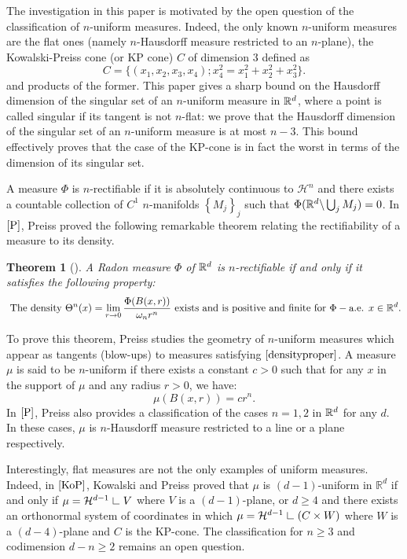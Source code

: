 \documentclass[11pt]{article}
\newtheorem{theorem}{Theorem}[section]
\theoremstyle{definition}
\theoremstyle{remark}
\numberwithin{equation}{section}
\newcommand{\res}{\hbox{{\vrule height .22cm}{\leaders\hrule\hskip .2cm}}}
\def\res{\hbox{ {\vrule height .22cm}{\leaders\hrule\hskip.2cm} } }
\begin{document}
 The investigation in this paper is motivated by the open question of the classification of $n$-uniform measures. Indeed, the only known $n$-uniform measures are the flat ones (namely $n$-Hausdorff measure restricted to an $n$-plane), the Kowalski-Preiss cone (or KP cone) $C$ of dimension $3$ defined as
\begin{equation}
\label{KPcone}
C =\{(x_1,x_2,x_3,x_4); x_4^2=x_1^2+x_2^2+x_3^2 \}.
\end{equation}
and products of the former.
This paper gives a sharp bound on the Hausdorff dimension of the singular set of an $n$-uniform measure in $\mathbb{R}^{d}$, where a point is called singular if its tangent is not $n$-flat: we prove that the Hausdorff dimension of the singular set of an $n$-uniform measure is at most $n-3$. 
This bound effectively proves that the case of the KP-cone is in fact the worst in terms of the dimension of its singular set.

A measure $\Phi$ is $n$-rectifiable if it is absolutely continuous to $\mathcal{H}^n$ and there exists a countable collection of $C^1$ $n$-manifolds $\left\lbrace M_j \right\rbrace_{j}$ such that $\Phi (\mathbb{R}^{d} \backslash \bigcup_{j} M_{j})=0$. In $\cite{P}$, Preiss proved the following remarkable theorem relating the rectifiability of a measure to its density.
\begin{theorem}[\cite{P}] \label{Preiss}
A Radon measure $\Phi$ of $\mathbb{R}^d$ is $n$-rectifiable if and only if it satisfies the following property:
 \begin{equation}\label{densityproper} \mbox{ The density }
\Theta^{n}(x)= \lim_{r \to 0} \frac{\Phi(B(x,r))}{\omega_{n} r^{n}}
\mbox{ exists and is positive and finite for }\Phi-\mbox{a.e. } x \in \mathbb{R}^{d}.
 \end{equation}
\end{theorem}
To prove this theorem, Preiss studies the geometry of $n$-uniform measures which appear as tangents (blow-ups) to measures satisfying $\eqref{densityproper}$.
A measure $\mu$ is said to be $n$-uniform if there exists a constant $c>0$ such that for any $x$ in the support of $\mu$ and any radius $r>0$, we have:
\begin{equation}
\mu(B(x,r))=cr^{n}.
\end{equation}
In $\cite{P}$, Preiss also provides a classification of the cases $n=1,2$ in $\mathbb{R}^{d}$ for any $d$. In these cases, $\mu$ is $n$-Hausdorff measure restricted to a line or a plane respectively.

Interestingly, flat measures are not the only examples of uniform measures. Indeed, in $\cite{KoP}$, Kowalski and Preiss proved that $\mu$ is $(d-1)$-uniform in $\mathbb{R}^d$ if and only if $\mu=\mathcal{H}^{d-1} \res V$
where $V$ is a $(d-1)$-plane, or $d \geq 4$ and there exists an orthonormal system of coordinates
in which $\mu= \mathcal{H}^{d-1} \res (C \times W)$ where $W$ is a $(d-4)$-plane and $C$ is the KP-cone.
The classification for $n \geq 3$ and codimension $d-n \geq 2$ remains an open question.
\end{document}
